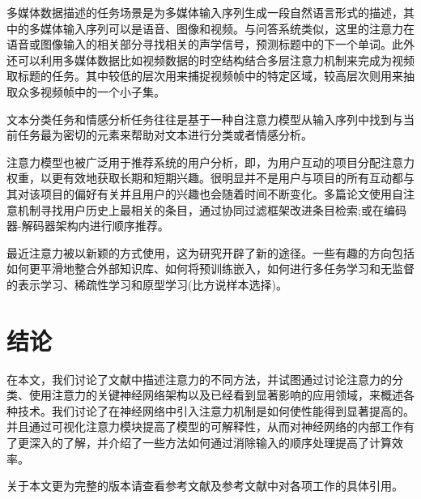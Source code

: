 \documentclass{ctexart}
\begin{document}
多媒体数据描述的任务场景是为多媒体输入序列生成一段自然语言形式的描述，其中的多媒体输入序列可以是语音、图像和视频。与问答系统类似，这里的注意力在语音或图像输入的相关部分寻找相关的声学信号，预测标题中的下一个单词。此外还可以利用多媒体数据比如视频数据的时空结构结合多层注意力机制来完成为视频取标题的任务。其中较低的层次用来捕捉视频帧中的特定区域，较高层次则用来抽取众多视频帧中的一个小子集。


文本分类任务和情感分析任务往往是基于一种自注意力模型从输入序列中找到与当前任务最为密切的元素来帮助对文本进行分类或者情感分析。


注意力模型也被广泛用于推荐系统的用户分析，即，为用户互动的项目分配注意力权重，以更有效地获取长期和短期兴趣。很明显并不是用户与项目的所有互动都与其对该项目的偏好有关并且用户的兴趣也会随着时间不断变化。多篇论文使用自注意机制寻找用户历史上最相关的条目，通过协同过滤框架改进条目检索;或在编码器-解码器架构内进行顺序推荐。


最近注意力被以新颖的方式使用，这为研究开辟了新的途径。一些有趣的方向包括如何更平滑地整合外部知识库、如何将预训练嵌入，如何进行多任务学习和无监督的表示学习、稀疏性学习和原型学习(比方说样本选择)。
\section{结论}
在本文，我们讨论了文献中描述注意力的不同方法，并试图通过讨论注意力的分类、使用注意力的关键神经网络架构以及已经看到显著影响的应用领域，来概述各种技术。我们讨论了在神经网络中引入注意力机制是如何使性能得到显著提高的。并且通过可视化注意力模块提高了模型的可解释性，从而对神经网络的内部工作有了更深入的了解，并介绍了一些方法如何通过消除输入的顺序处理提高了计算效率。


关于本文更为完整的版本请查看参考文献及参考文献中对各项工作的具体引用。
\end{document}
